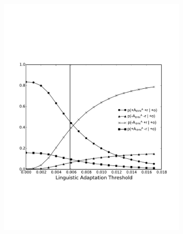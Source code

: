 \documentclass[man,biblatex,floatsintext]{apa6}
\begin{document}
\begin{figure}[!htb]
\begin{subfigure}{.5\textwidth}
  \centering
  \includegraphics[width=\linewidth]{Figures/SynAposi_new_rob_New_Enlarge.pdf}
  \caption{\label{fig:ProbSynPoso}}
\end{subfigure}%
\begin{subfigure}{.5\textwidth}
  \centering

\end{subfigure}
\end{figure}
\end{document}
